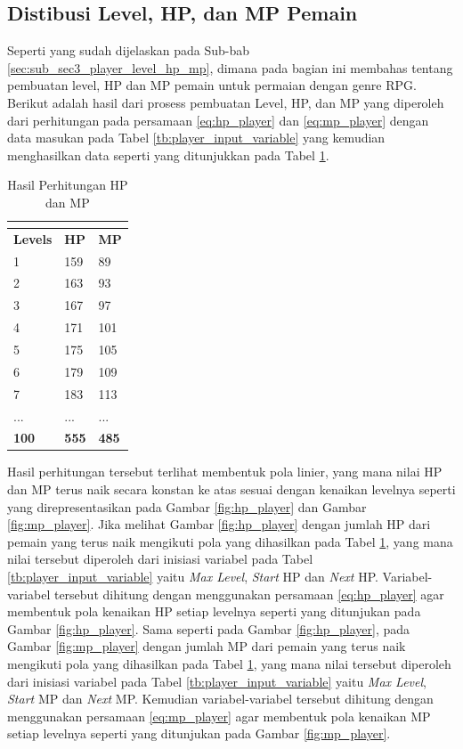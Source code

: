 \subsection{Distibusi Level, HP, dan MP Pemain}
\label{sec:sub_sec4_eval_dist_hp_mp_level_single-character}
\vspace{1ex}

Seperti yang sudah dijelaskan pada Sub-bab \ref{sec:sub_sec3_player_level_hp_mp}, dimana pada bagian ini membahas tentang pembuatan level, HP dan MP pemain untuk permaian dengan genre RPG. Berikut adalah hasil dari prosess pembuatan Level, HP, dan MP yang diperoleh dari perhitungan pada persamaan \ref{eq:hp_player} dan \ref{eq:mp_player} dengan data masukan pada Tabel \ref{tb:player_input_variable} yang kemudian menghasilkan data seperti yang ditunjukkan pada Tabel \ref{tb:player_hp_mp}.

\begin{longtable}{|l|l|l|}
	\caption{Hasil Perhitungan HP dan MP}
	\vspace{1ex}
	\label{tb:player_hp_mp}\\
	\hline
	\rowcolor[HTML]{C0C0C0} 
	\textbf{Levels} & \textbf{HP} & \textbf{MP} \\ \hline
	1 & 159 & 89 \\ \hline
	2 & 163 & 93 \\ \hline
	3 & 167 & 97 \\ \hline
	4 & 171 & 101 \\ \hline
	5 & 175 & 105 \\ \hline
	6 & 179 & 109 \\ \hline
	7 & 183 & 113 \\ \hline
	... & ... & ... \\ \hline
	\textbf{100} & \textbf{555} & \textbf{485} \\ \hline
\end{longtable}
\vspace{1ex}

Hasil perhitungan tersebut terlihat membentuk pola linier, yang mana nilai HP dan MP terus naik secara konstan ke atas sesuai dengan kenaikan levelnya seperti yang direpresentasikan pada Gambar \ref{fig:hp_player} dan Gambar \ref{fig:mp_player}. Jika melihat Gambar \ref{fig:hp_player} dengan jumlah HP dari pemain yang terus naik mengikuti pola yang dihasilkan pada Tabel \ref{tb:player_hp_mp}, yang mana nilai tersebut diperoleh dari inisiasi variabel pada Tabel \ref{tb:player_input_variable} yaitu \textit{Max Level}, \textit{Start} HP dan \textit{Next} HP. Variabel-variabel tersebut dihitung dengan menggunakan persamaan \ref{eq:hp_player} agar membentuk pola kenaikan HP setiap levelnya seperti yang ditunjukan pada Gambar \ref{fig:hp_player}. Sama seperti pada Gambar \ref{fig:hp_player}, pada Gambar \ref{fig:mp_player} dengan jumlah MP dari pemain yang terus naik mengikuti pola yang dihasilkan pada Tabel \ref{tb:player_hp_mp}, yang mana nilai tersebut diperoleh dari inisiasi variabel pada Tabel \ref{tb:player_input_variable} yaitu \textit{Max Level}, \textit{Start} MP dan \textit{Next} MP. Kemudian variabel-variabel tersebut dihitung dengan menggunakan persamaan \ref{eq:mp_player} agar membentuk pola kenaikan MP setiap levelnya seperti yang ditunjukan pada Gambar \ref{fig:mp_player}. 


